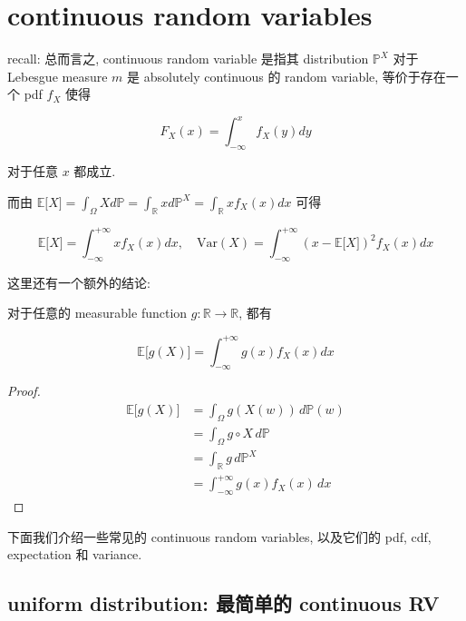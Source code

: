 \documentclass{qlnotes-export}
\begin{document}
\section{continuous random variables}\label{continuous-random-variables}

recall: 总而言之, continuous random variable 是指其 distribution \({\mathbb{P}}^{X}\) 对于 Lebesgue measure \(m\) 是 absolutely continuous 的 random variable, 等价于存在一个 pdf \(f_{X}\) 使得

\[F_{X}(x) = \int_{- \infty}^{x}f_{X}(y)dy\]

对于任意 \(x\) 都成立.

而由 \({\mathbb{E}}\lbrack X\rbrack = \int_{\Omega}Xd{\mathbb{P}} = \int_{\mathbb{R}}xd{\mathbb{P}}^{X} = \int_{\mathbb{R}}xf_{X}(x)dx\) 可得

\[{\mathbb{E}}\lbrack X\rbrack = \int_{- \infty}^{+ \infty}xf_{X}(x)dx,\quad\text{Var}(X) = \int_{- \infty}^{+ \infty}(x - {\mathbb{E}}\lbrack X\rbrack)^{2}f_{X}(x)dx\]

这里还有一个额外的结论:

\begin{proposition}

对于任意的 measurable function \(g:{\mathbb{R}}\rightarrow{\mathbb{R}}\), 都有

\[{\mathbb{E}}\lbrack g(X)\rbrack = \int_{- \infty}^{+ \infty}g(x)f_{X}(x)dx\]

\end{proposition}

\begin{proof}

\[\begin{matrix}
{{\mathbb{E}}\lbrack g(X)\rbrack} & {= \int_{\Omega}g(X(w))\, d{\mathbb{P}}(w)} \\
 & {= \int_{\Omega}g \circ X\, d{\mathbb{P}}} \\
 & {= \int_{\mathbb{R}}g\, d{\mathbb{P}}^{X}} \\
 & {= \int_{- \infty}^{+ \infty}g(x)f_{X}(x)\, dx}
\end{matrix}\]

\end{proof}

下面我们介绍一些常见的 continuous random variables, 以及它们的 pdf, cdf, expectation 和 variance.

\subsection{uniform distribution: 最简单的 continuous RV}\label{uniform-distribution-ux6700ux7b80ux5355ux7684-continuous-rv}
\end{document}
